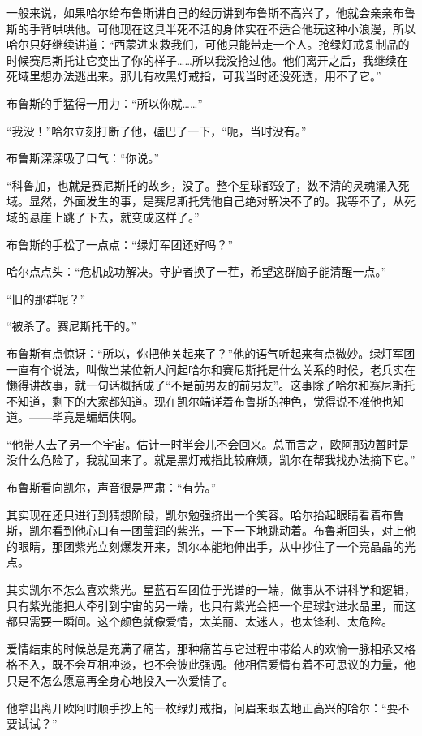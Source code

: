 \documentclass[../main]{subfiles}
\begin{document}
一般来说，如果哈尔给布鲁斯讲自己的经历讲到布鲁斯不高兴了，他就会亲亲布鲁斯的手背哄哄他。可他现在这具半死不活的身体实在不适合他玩这种小浪漫，所以哈尔只好继续讲道：“西蒙进来救我们，可他只能带走一个人。抢绿灯戒复制品的时候赛尼斯托让它变出了你的样子……所以我没抢过他。他们离开之后，我继续在死域里想办法逃出来。那儿有枚黑灯戒指，可我当时还没死透，用不了它。”

布鲁斯的手猛得一用力：“所以你就……”

“我没！”哈尔立刻打断了他，磕巴了一下，“呃，当时没有。”

布鲁斯深深吸了口气：“你说。”

“科鲁加，也就是赛尼斯托的故乡，没了。整个星球都毁了，数不清的灵魂涌入死域。显然，外面发生的事，是赛尼斯托凭他自己绝对解决不了的。我等不了，从死域的悬崖上跳了下去，就变成这样了。”

布鲁斯的手松了一点点：“绿灯军团还好吗？”

哈尔点点头：“危机成功解决。守护者换了一茬，希望这群脑子能清醒一点。”

“旧的那群呢？”

“被杀了。赛尼斯托干的。”

布鲁斯有点惊讶：“所以，你把他关起来了？”他的语气听起来有点微妙。绿灯军团一直有个说法，叫做当某位新人问起哈尔和赛尼斯托是什么关系的时候，老兵实在懒得讲故事，就一句话概括成了“不是前男友的前男友”。这事除了哈尔和赛尼斯托不知道，剩下的大家都知道。现在凯尔端详着布鲁斯的神色，觉得说不准他也知道。——毕竟是蝙蝠侠啊。

“他带人去了另一个宇宙。估计一时半会儿不会回来。总而言之，欧阿那边暂时是没什么危险了，我就回来了。就是黑灯戒指比较麻烦，凯尔在帮我找办法摘下它。”

布鲁斯看向凯尔，声音很是严肃：“有劳。”

其实现在还只进行到猜想阶段，凯尔勉强挤出一个笑容。哈尔抬起眼睛看着布鲁斯，凯尔看到他心口有一团莹润的紫光，一下一下地跳动着。布鲁斯回头，对上他的眼睛，那团紫光立刻爆发开来，凯尔本能地伸出手，从中抄住了一个亮晶晶的光点。

其实凯尔不怎么喜欢紫光。星蓝石军团位于光谱的一端，做事从不讲科学和逻辑，只有紫光能把人牵引到宇宙的另一端，也只有紫光会把一个星球封进水晶里，而这都只需要一瞬间。这个颜色就像爱情，太美丽、太迷人，也太锋利、太危险。

爱情结束的时候总是充满了痛苦，那种痛苦与它过程中带给人的欢愉一脉相承又格格不入，既不会互相冲淡，也不会彼此强调。他相信爱情有着不可思议的力量，他只是不怎么愿意再全身心地投入一次爱情了。

他拿出离开欧阿时顺手抄上的一枚绿灯戒指，问眉来眼去地正高兴的哈尔：“要不要试试？”
\end{document}
